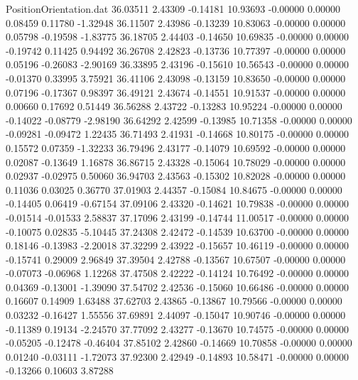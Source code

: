 \begin{filecontents}{PositionOrientation.dat}
  36.03511    2.43309   -0.14181    10.93693   -0.00000    0.00000    0.08459    0.11780   -1.32948
  36.11507    2.43986   -0.13239    10.83063   -0.00000    0.00000    0.05798   -0.19598   -1.83775
  36.18705    2.44403   -0.14650    10.69835   -0.00000    0.00000   -0.19742    0.11425    0.94492
  36.26708    2.42823   -0.13736    10.77397   -0.00000    0.00000    0.05196   -0.26083   -2.90169
  36.33895    2.43196   -0.15610    10.56543   -0.00000    0.00000   -0.01370    0.33995    3.75921
  36.41106    2.43098   -0.13159    10.83650   -0.00000    0.00000    0.07196   -0.17367    0.98397
  36.49121    2.43674   -0.14551    10.91537   -0.00000    0.00000    0.00660    0.17692    0.51449
  36.56288    2.43722   -0.13283    10.95224   -0.00000    0.00000   -0.14022   -0.08779   -2.98190
  36.64292    2.42599   -0.13985    10.71358   -0.00000    0.00000   -0.09281   -0.09472    1.22435
  36.71493    2.41931   -0.14668    10.80175   -0.00000    0.00000    0.15572    0.07359   -1.32233
  36.79496    2.43177   -0.14079    10.69592   -0.00000    0.00000    0.02087   -0.13649    1.16878
  36.86715    2.43328   -0.15064    10.78029   -0.00000    0.00000    0.02937   -0.02975    0.50060
  36.94703    2.43563   -0.15302    10.82028   -0.00000    0.00000    0.11036    0.03025    0.36770
  37.01903    2.44357   -0.15084    10.84675   -0.00000    0.00000   -0.14405    0.06419   -0.67154
  37.09106    2.43320   -0.14621    10.79838   -0.00000    0.00000   -0.01514   -0.01533    2.58837
  37.17096    2.43199   -0.14744    11.00517   -0.00000    0.00000   -0.10075    0.02835   -5.10445
  37.24308    2.42472   -0.14539    10.63700   -0.00000    0.00000    0.18146   -0.13983   -2.20018
  37.32299    2.43922   -0.15657    10.46119   -0.00000    0.00000   -0.15741    0.29009    2.96849
  37.39504    2.42788   -0.13567    10.67507   -0.00000    0.00000   -0.07073   -0.06968    1.12268
  37.47508    2.42222   -0.14124    10.76492   -0.00000    0.00000    0.04369   -0.13001   -1.39090
  37.54702    2.42536   -0.15060    10.66486   -0.00000    0.00000    0.16607    0.14909    1.63488
  37.62703    2.43865   -0.13867    10.79566   -0.00000    0.00000    0.03232   -0.16427    1.55556
  37.69891    2.44097   -0.15047    10.90746   -0.00000    0.00000   -0.11389    0.19134   -2.24570
  37.77092    2.43277   -0.13670    10.74575   -0.00000    0.00000   -0.05205   -0.12478   -0.46404
  37.85102    2.42860   -0.14669    10.70858   -0.00000    0.00000    0.01240   -0.03111   -1.72073
  37.92300    2.42949   -0.14893    10.58471   -0.00000    0.00000   -0.13266    0.10603    3.87288

\end{filecontents}
